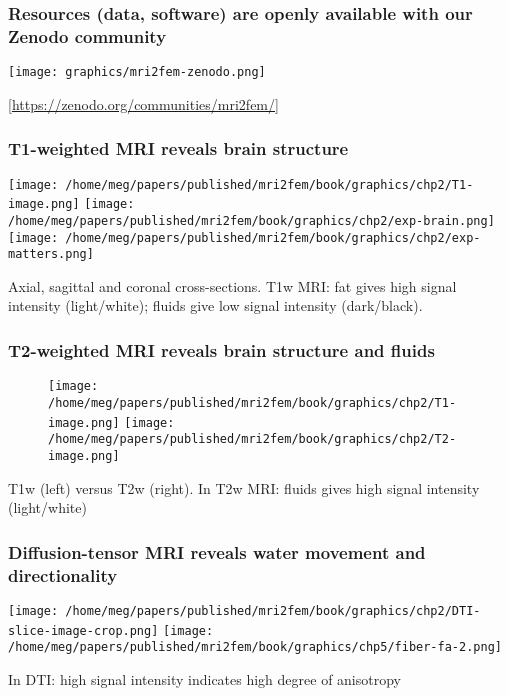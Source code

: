 \documentclass[10pt, mathserif, aspectratio=169, t, usenames, dvipsnames]{beamer}
\newcommand{\refer}[1]{\begin{flushright}{\tiny \textcolor{Cerulean}{[#1]}}\end{flushright}}
\begin{document}
\begin{frame}
  \frametitle{Resources (data, software) are openly available with our Zenodo community}
  \vspace{-0.5em}
  \centering
  \texttt{[image: graphics/mri2fem-zenodo.png]} \\
  \vspace{-1em}
  \refer{\href{https://zenodo.org/communities/mri2fem/}{https://zenodo.org/communities/mri2fem/}}
\end{frame}

\begin{frame}
  \frametitle{T1-weighted MRI reveals brain structure}
  \begin{center}
  \texttt{[image: /home/meg/papers/published/mri2fem/book/graphics/chp2/T1-image.png]}
  \texttt{[image: /home/meg/papers/published/mri2fem/book/graphics/chp2/exp-brain.png]}
  \texttt{[image: /home/meg/papers/published/mri2fem/book/graphics/chp2/exp-matters.png]}
  \end{center}

  Axial, sagittal and coronal cross-sections. T1w MRI: fat gives high
  signal intensity (light/white); fluids give low signal intensity
  (dark/black).
\end{frame}

\begin{frame}
  \frametitle{T2-weighted MRI reveals brain structure and fluids}
\begin{figure}
  \centering
  \texttt{[image: /home/meg/papers/published/mri2fem/book/graphics/chp2/T1-image.png]}
  \hspace{2em}
  \texttt{[image: /home/meg/papers/published/mri2fem/book/graphics/chp2/T2-image.png]}
\end{figure}
T1w (left) versus T2w (right). In T2w MRI: fluids gives high signal intensity (light/white)
\end{frame}

\begin{frame}
  \frametitle{Diffusion-tensor MRI reveals water movement and directionality}
  \begin{center}
  \texttt{[image: /home/meg/papers/published/mri2fem/book/graphics/chp2/DTI-slice-image-crop.png]}
  \hspace{2em}
  \texttt{[image: /home/meg/papers/published/mri2fem/book/graphics/chp5/fiber-fa-2.png]}
  \end{center}
  In DTI: high signal intensity indicates high degree of anisotropy 
\end{frame}
\end{document}
